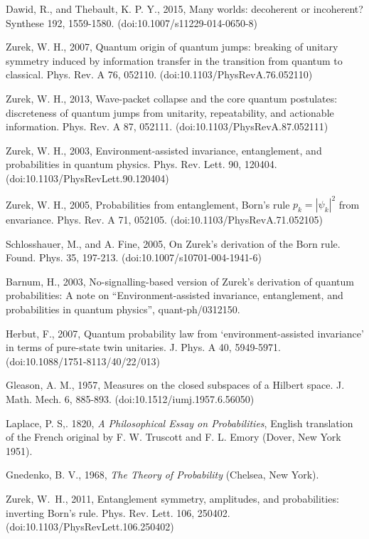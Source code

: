\documentclass[aps,amsmath,amssymb,amsfonts,floatfix]{revtex4-1}
\newcommand{\+}         {\dagger}
\begin{document}
{{{\begin{references}
 Dawid, R., and Thebault, K. P. Y., 2015, Many worlds: decoherent or incoherent? Synthese 192, 1559-1580. (doi:10.1007/s11229-014-0650-8)    

 Zurek, W. H., 2007, Quantum origin of quantum jumps: breaking of unitary symmetry induced
by information transfer in the transition from quantum to classical. Phys. Rev. A 76, 052110.
(doi:10.1103/PhysRevA.76.052110)

 Zurek, W. H., 2013,
Wave-packet collapse and the core quantum postulates: discreteness of
quantum jumps from unitarity, repeatability, and actionable information. Phys. Rev. A 87,
052111. (doi:10.1103/PhysRevA.87.052111)


 Zurek, W. H., 2003, Environment-assisted invariance, entanglement, and probabilities in
quantum physics. Phys. Rev. Lett. 90, 120404. (doi:10.1103/PhysRevLett.90.120404)

 Zurek, W. H., 2005, Probabilities from entanglement, Born's rule $p_k = |\psi_k|^2$ from envariance.
Phys. Rev. A 71, 052105. (doi:10.1103/PhysRevA.71.052105)

 Schlosshauer, M., and A. Fine,  2005,  On Zurek's derivation of the Born rule. Found. Phys. 35, 197-213.
(doi:10.1007/s10701-004-1941-6)

 Barnum, H., 2003, No-signalling-based version of Zurek's derivation
of quantum probabilities: A note on ``Environment-assisted invariance,
entanglement, and probabilities in quantum physics'', quant-ph/0312150.

 Herbut, F., 2007, Quantum probability law from `environment-assisted invariance' in terms of
pure-state twin unitaries. J. Phys. A 40, 5949-5971. (doi:10.1088/1751-8113/40/22/013)

 Gleason, A. M., 1957, Measures on the closed subspaces of a Hilbert space. J. Math. Mech. 6,
885-893. (doi:10.1512/iumj.1957.6.56050)

 Laplace, P. S,. 1820, {\it A Philosophical Essay on Probabilities}, English translation of
the French original by F. W. Truscott and F. L. Emory (Dover, New York 1951).

 Gnedenko,  B. V., 1968, {\it The Theory of Probability}
(Chelsea, New York).

 Zurek, W.~H., 2011, Entanglement symmetry, amplitudes, and probabilities: inverting Born's
rule. Phys. Rev. Lett. 106, 250402. (doi:10.1103/PhysRevLett.106.250402)


\end{references}}}}
\end{document}
